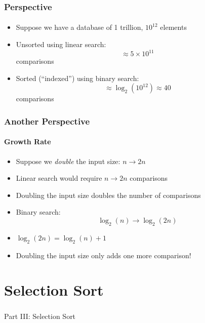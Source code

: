 \documentclass[]{beamer}
\begin{document}
\begin{frame}[fragile]
  \frametitle{Perspective}
  \framesubtitle{}

\begin{itemize}[<+->]
  \item Suppose we have a database of 1 trillion, $10^{12}$ elements
  \item Unsorted using linear search: 
    $$\approx 5\times 10^{11}$$
    comparisons
  \item Sorted (``indexed'') using binary search:
    $$\approx \log_2{(10^{12})} \approx 40$$
    comparisons
\end{itemize}

\end{frame}

\begin{frame}[fragile]
  \frametitle{Another Perspective}
  \framesubtitle{Growth Rate}

\begin{itemize}[<+->]
  \item Suppose we \emph{double} the input size: $n \rightarrow 2n$
  \item Linear search would require $n \rightarrow 2n$ comparisons
  \item Doubling the input size doubles the number of comparisons
  \item Binary search: 
   $$\log_2{(n)} \rightarrow \log_2{(2n)}$$
  \item $\log_2{(2n)} = \log_2{(n)} + 1$
  \item Doubling the input size only adds one more comparison!
\end{itemize}

\end{frame}

\section{Selection Sort}

\begin{frame}
    \frametitle{}
    \framesubtitle{}
    
    \begin{center}
    {\Huge Part III: Selection Sort}\\
    {\Large ~}
    \end{center}

\end{frame}
\end{document}
